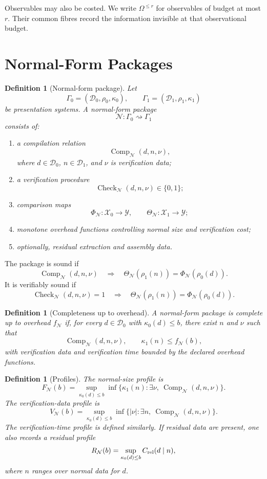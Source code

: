 \documentclass[11pt]{article}
\newtheorem{definition}[theorem]{Definition}
\DeclareMathOperator{\CheckNF}{Check}
\DeclareMathOperator{\Comp}{Comp}
\begin{document}
Observables may also be costed. We write \(\Omega^{\leq r}\) for observables of budget at most \(r\). Their common fibres record the information invisible at that observational budget.

\section{Normal-Form Packages}

\begin{definition}[Normal-form package]
Let
\[
\Gamma_0=(\mathcal D_0,\rho_0,\kappa_0),
\qquad
\Gamma_1=(\mathcal D_1,\rho_1,\kappa_1)
\]
be presentation systems. A normal-form package
\[
\mathcal N:\Gamma_0\rightsquigarrow\Gamma_1
\]
consists of:
\begin{enumerate}[label=\textup{(\roman*)}]
\item a compilation relation
\[
\Comp_{\mathcal N}(d,n,\nu),
\]
where \(d\in\mathcal D_0\), \(n\in\mathcal D_1\), and \(\nu\) is verification data;
\item a verification procedure
\[
\CheckNF_{\mathcal N}(d,n,\nu)\in\{0,1\};
\]
\item comparison maps
\[
\Phi_{\mathcal N}:\mathcal X_0\to\mathcal Y,
\qquad
\Theta_{\mathcal N}:\mathcal X_1\to\mathcal Y;
\]
\item monotone overhead functions controlling normal size and verification cost;
\item optionally, residual extraction and assembly data.
\end{enumerate}
\end{definition}

The package is sound if
\[
\Comp_{\mathcal N}(d,n,\nu)
\quad\Longrightarrow\quad
\Theta_{\mathcal N}(\rho_1(n))=\Phi_{\mathcal N}(\rho_0(d)).
\]
It is verifiably sound if
\[
\CheckNF_{\mathcal N}(d,n,\nu)=1
\quad\Longrightarrow\quad
\Theta_{\mathcal N}(\rho_1(n))=\Phi_{\mathcal N}(\rho_0(d)).
\]

\begin{definition}[Completeness up to overhead]
A normal-form package is complete up to overhead \(f_{\mathcal N}\) if, for every \(d\in\mathcal D_0\) with \(\kappa_0(d)\leq b\), there exist \(n\) and \(\nu\) such that
\[
\Comp_{\mathcal N}(d,n,\nu),
\qquad
\kappa_1(n)\leq f_{\mathcal N}(b),
\]
with verification data and verification time bounded by the declared overhead functions.
\end{definition}

\begin{definition}[Profiles]
The normal-size profile is
\[
F_{\mathcal N}(b)
=
\sup_{\kappa_0(d)\leq b}
\inf\{\kappa_1(n):\exists \nu,\ \Comp_{\mathcal N}(d,n,\nu)\}.
\]
The verification-data profile is
\[
V_{\mathcal N}(b)
=
\sup_{\kappa_0(d)\leq b}
\inf\{|\nu|:\exists n,\ \Comp_{\mathcal N}(d,n,\nu)\}.
\]
The verification-time profile is defined similarly. If residual data are present, one also records a residual profile
\[
R_{\mathcal N}(b)=
\sup_{\kappa_0(d)\leq b} C_{\rm rel}(d\mid n),
\]
where \(n\) ranges over normal data for \(d\).
\end{definition}
\end{document}
